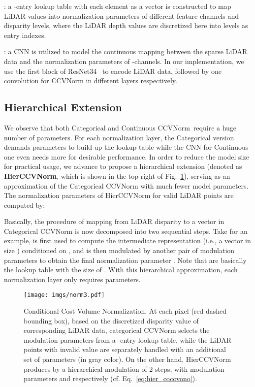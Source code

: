 \documentclass[letterpaper, 10 pt, conference]{ieeeconf}
\newcommand{\modelNameCBN}{CCVNorm }
\newcommand{\modelNameCBNPunc}{CCVNorm}
\newcommand{\modelNameHierCBN}{HierCCVNorm }
\newcommand{\modelNameHierCBNPunc}{HierCCVNorm}
\newcommand{\figref}{Fig.~\ref}
\begin{document}
{{{\noindent {\bf Categorical \modelNameCBNPunc}}: a -entry lookup table with each element as a  vector is constructed to map LiDAR values into normalization parameters  of different feature channels and disparity levels, where the LiDAR depth values are discretized here into  levels as entry indexes. 


{\noindent {\bf Continuous \modelNameCBNPunc}}: a CNN is utilized to model the continuous mapping between the sparse LiDAR data  and the normalization parameters of -channels. In our implementation, we use the first block of ResNet34~\cite{resnet} to encode LiDAR data, followed by one  convolution for \modelNameCBN in different layers respectively. 

}

\subsection{Hierarchical Extension}{
We observe that both Categorical and Continuous \modelNameCBNPunc~require a huge number of parameters. For each normalization layer, the Categorical version demands  parameters to build up the lookup table while the CNN for Continuous one even needs more for desirable performance. In order to reduce the model size for practical usage, we advance to propose a hierarchical extension (denoted as \textbf{\modelNameHierCBNPunc}, which is shown in the top-right of \figref{fig:normalization}), serving as an approximation of the Categorical \modelNameCBN with much fewer model parameters. The normalization parameters of \modelNameHierCBN for valid LiDAR points are computed by:

\noindent Basically, the procedure of mapping from LiDAR disparity to a  vector in Categorical \modelNameCBN is now decomposed into two sequential steps. Take  for an example,  is first used to compute the intermediate representation (i.e., a vector in size ) conditioned on , and is then modulated by another pair of modulation parameters  to obtain the final normalization parameter . Note that  are basically the lookup table with the size of . With this hierarchical approximation, each normalization layer only requires  parameters.

}
}

\begin{figure}[t]
\centering
\texttt{[image: imgs/norm3.pdf]}
\caption{\small{
Conditional Cost Volume Normalization. At each pixel (red dashed bounding box), based on the discretized disparity value of corresponding LiDAR data, categorical \modelNameCBN selects the modulation parameters  from a -entry lookup table, while the LiDAR points with invalid value are separately handled with an additional set of parameters (in gray color). On the other hand, \modelNameHierCBN produces  by a hierarchical modulation of 2 steps, with modulation parameters  and  respectively (cf. Eq.~\ref{eq:hier_cocovono}).
}}
\label{fig:normalization}
\end{figure}
\end{document}

